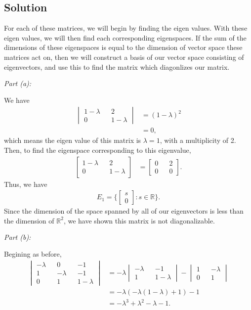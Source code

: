 \documentclass[10pt,a4paper]{article}
\makeatletter
\newcommand{\proofpart}[2]{%
  \par
  \addvspace{\medskipamount}%
  \noindent\emph{Part #1: #2}\par\nobreak
  \addvspace{\smallskipamount}%
  \@afterheading
}
\theoremstyle{definition}
\makeatother
\begin{document}
\subsection*{Solution}
For each of these matrices, we will begin by finding the eigen values. With these eigen values, we will then find each corresponding eigenspaces. If the sum of the dimensions of these eigenspaces is equal to the dimension of vector space these matrices act on, then we will construct a basis of our vector space consisting of eigenvectors, and use this to find the matrix which diagonlizes our matrix.
\proofpart{(a)}{} We have
\begin{align*}
\begin{vmatrix}
1 - \lambda && 2\\
0 && 1 - \lambda
\end{vmatrix} &= (1 - \lambda)^2\\
&= 0,
\end{align*}
which means the eigen value of this matrix is $\lambda = 1$, with a multiplicity of 2. Then, to find the eigenspace corresponding to this eigenvalue,
\begin{align*}
\begin{bmatrix}
1 - \lambda && 2\\
0 && 1 - \lambda
\end{bmatrix} &= \begin{bmatrix}
0 && 2\\
0 && 0
\end{bmatrix}.
\end{align*}
Thus, we have
\begin{align*}
E_1 = \Biggl\{ \begin{bmatrix}
s\\
0
\end{bmatrix} : s \in \mathbb{R} \Biggr\}.
\end{align*}
Since the dimension of the space spanned by all of our eigenvectors is less than the dimension of $\mathbb{R}^2$, we have shown this matrix is not diagonalizable.
\proofpart{(b)}{} Begining as before,
\begin{align*}
\begin{vmatrix}
-\lambda && 0 && -1\\
1 && -\lambda && -1\\
0 && 1 && 1 - \lambda
\end{vmatrix} &= -\lambda \begin{vmatrix}
-\lambda && -1\\
1 && 1 - \lambda \end{vmatrix} - \begin{vmatrix}
1 && -\lambda\\
0 && 1
\end{vmatrix}\\
&= -\lambda (-\lambda(1 - \lambda) + 1) - 1\\
&= -\lambda^3 + \lambda^2  - \lambda - 1.
\end{align*}
\end{document}
